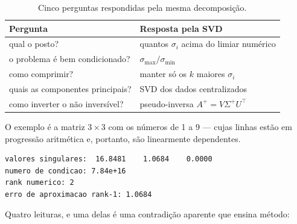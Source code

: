 \begin{table}[htbp]
\centering
\caption{Cinco perguntas respondidas pela mesma decomposição.}
\label{tab:svd-usos}
\footnotesize
\begin{tabular}{@{}ll@{}}
\toprule
\textbf{Pergunta} & \textbf{Resposta pela SVD} \\
\midrule
qual o posto?                & quantos $\sigma_i$ acima do limiar numérico \\
o problema é bem condicionado? & $\sigma_{\max} / \sigma_{\min}$ \\
como comprimir?              & manter só os $k$ maiores $\sigma_i$ \\
quais as componentes principais? & SVD dos dados centralizados \\
como inverter o não inversível? & pseudo-inversa $A^{+} = V\Sigma^{+}U^\top$ \\
\bottomrule
\end{tabular}
\end{table}

O exemplo é a matriz $3\times3$ com os números de 1 a 9 --- cujas linhas estão em
progressão aritmética e, portanto, são linearmente dependentes.

\begin{lstlisting}[style=bt, language=bash,
    caption={Saída real de \texttt{./dist/bin/eigen\_demo}, demo 3.}]
valores singulares:  16.8481    1.0684    0.0000
numero de condicao: 7.84e+16
rank numerico: 2
erro de aproximacao rank-1: 1.0684
\end{lstlisting}

Quatro leituras, e uma delas é uma contradição aparente que ensina método:


